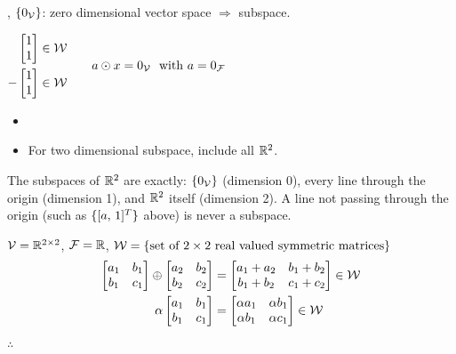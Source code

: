 \sep
\point $\{0_{\mathcal{V}}\}$: zero dimensional vector space $\Rightarrow$ subspace.

\begin{center}
\qquad
$\begin{aligned}
\begin{bmatrix}1\\1\end{bmatrix}&\in\mathcal{W}\\
-\begin{bmatrix}1\\1\end{bmatrix}&\in\mathcal{W}
\end{aligned}
\qquad
a\odot x = 0_{\mathcal{V}} \ \text{ with } a=0_{\mathcal{F}}$
\end{center}
\begin{itemize}[nosep]
\item {}
\item For two dimensional subspace, include all $\R^2$.
\end{itemize}
\begin{insight}[Subspaces of $\R^2$]
The subspaces of $\R^2$ are exactly: $\{0_{\mathcal{V}}\}$ (dimension 0), every line through the origin (dimension 1), and $\R^2$ itself (dimension 2). A line not passing through the origin (such as $\{[a,\,1]^{T}\}$ above) is never a subspace.
\end{insight}

\begin{example}
$\mathcal{V}=\mathbb{R}^{2\times2}$, $\mathcal{F}=\mathbb{R}$, \quad $\mathcal{W} = \{\text{set of $2\times2$ real valued symmetric matrices}\}$
\begin{align*}
\begin{bmatrix}a_1&b_1\\b_1&c_1\end{bmatrix}\oplus\begin{bmatrix}a_2&b_2\\b_2&c_2\end{bmatrix} &= \begin{bmatrix}a_1+a_2 & b_1+b_2\\ b_1+b_2 & c_1+c_2\end{bmatrix}\in\mathcal{W}\\
\alpha\begin{bmatrix}a_1&b_1\\b_1&c_1\end{bmatrix} &= \begin{bmatrix}\alpha a_1&\alpha b_1\\ \alpha b_1&\alpha c_1\end{bmatrix}\in\mathcal{W}
\end{align*}
$\therefore$ 
\end{example}


